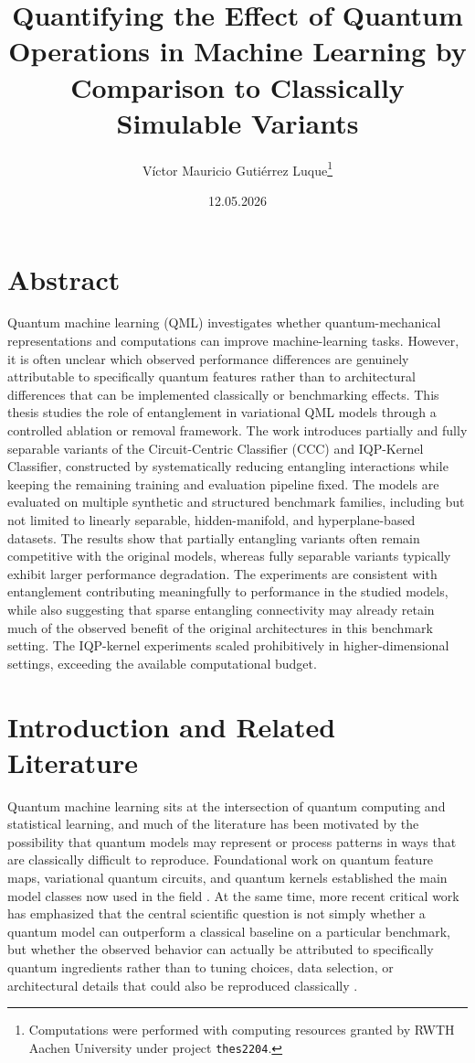 \documentclass[12pt,a4paper,openany]{report}
\title{Quantifying the Effect of Quantum Operations in Machine Learning by Comparison to Classically Simulable Variants}
\author{Víctor Mauricio Gutiérrez Luque\thanks{Computations were performed with computing resources granted by RWTH Aachen University under project \texttt{thes2204}.}}
\date{12.05.2026}
\let\parencite\citep
\begin{document}
\begingroup
\renewcommand{\thefootnote}{}
\maketitle
\endgroup
\setcounter{footnote}{0}

\chapter*{Abstract}
Quantum machine learning (QML) investigates whether quantum-mechanical representations and computations can improve machine-learning tasks. However, it is often unclear which observed performance differences are genuinely attributable to specifically quantum features rather than to architectural differences that can be implemented classically or benchmarking effects. This thesis studies the role of entanglement in variational QML models through a controlled ablation or removal framework. The work introduces partially and fully separable variants of the Circuit-Centric Classifier (CCC) and IQP-Kernel Classifier, constructed by systematically reducing entangling interactions while keeping the remaining training and evaluation pipeline fixed. The models are evaluated on multiple synthetic and structured benchmark families, including but not limited to linearly separable, hidden-manifold, and hyperplane-based datasets. The results show that partially entangling variants often remain competitive with the original models, whereas fully separable variants typically exhibit larger performance degradation. The experiments are consistent with entanglement contributing meaningfully to performance in the studied models, while also suggesting that sparse entangling connectivity may already retain much of the observed benefit of the original architectures in this benchmark setting. The IQP-kernel experiments scaled prohibitively in higher-dimensional settings, exceeding the available computational budget.
\tableofcontents

\chapter{Introduction and Related Literature}

Quantum machine learning sits at the intersection of quantum computing and statistical learning, and much of the literature has been motivated by the possibility that quantum models may represent or process patterns in ways that are classically difficult to reproduce. Foundational work on quantum feature maps, variational quantum circuits, and quantum kernels established the main model classes now used in the field \parencite{mitarai2018quantum,schuld2019evaluating,havlicek2019supervised,benedetti2019parameterized}. At the same time, more recent critical work has emphasized that the central scientific question is not simply whether a quantum model can outperform a classical baseline on a particular benchmark, but whether the observed behavior can actually be attributed to specifically quantum ingredients rather than to tuning choices, data selection, or architectural details that could also be reproduced classically \parencite{bowles2024better}.
\end{document}
